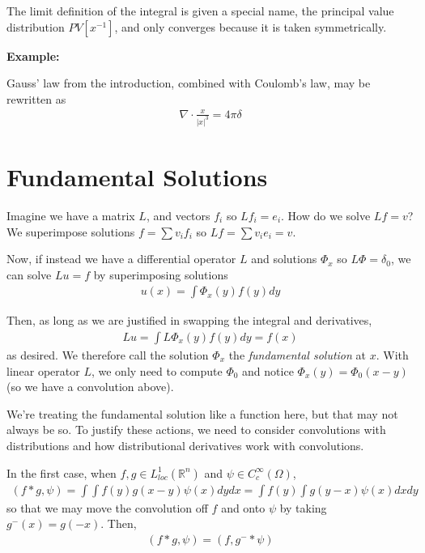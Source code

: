 \documentclass{article}
\newcommand{\R}{{\mathbb{R}}}
\begin{document}
	The limit definition of the integral is given a special name, the principal value distribution $PV[x^{-1}]$, and only converges because it is taken symmetrically. 
	
	
	\vspace{0.25 cm}
	\textbf{Example:}
	
	Gauss' law from the introduction, combined with Coulomb's law, may be rewritten as 
	\begin{align*}
		\nabla \cdot  \frac{x}{|x|^{3}} = 4 \pi \delta 
	\end{align*}
	
	
	\section{Fundamental Solutions}
	
	Imagine we have a matrix $L$, and vectors $f_i$ so $L f_i = e_i$. How do we solve $Lf = v$? We superimpose solutions $f = \sum v_{i}f_{i}$ so $Lf = \sum v_{i}e_{i} = v$. 
	
	Now, if instead we have a differential operator $L$ and solutions $\Phi_{x}$ so $L \Phi = \delta_0$, we can solve $Lu = f$ by superimposing solutions 
	\begin{align*}
		u(x) = \int \Phi_x(y) f(y)dy
	\end{align*}
	
	Then, as long as we are justified in swapping the integral and derivatives, 
	\begin{align*}
		Lu = \int L\Phi_x(y) f(y) dy = f(x)
	\end{align*}
	as desired. We therefore call the solution $\Phi_{x}$ the \textit{fundamental solution} at $x$. With linear operator $L$, we only need to compute $\Phi_0$ and notice $\Phi_{x}(y) = \Phi_{0}(x-y)$ (so we have a convolution above). 
	
	We're treating the fundamental solution like a function here, but that may not always be so. To justify these actions, we need to consider convolutions with distributions and how distributional derivatives work with convolutions. 
	
	In the first case, when $f,g \in L^{1}_{loc}(\R^{n})$ and $\psi \in C_{c}^{\infty}(\Omega)$, 
	\begin{align*}
		(f*g,\psi) = \int \int f(y)g(x-y)\psi(x)dydx = \int f(y) \int g(y-x)\psi(x)dxdy
	\end{align*}
	so that we may move the convolution off $f$ and onto $\psi$ by taking $g^-(x) = g(-x)$. Then, 
	\begin{align*}
		(f*g,\psi) = (f,g^- * \psi)
	\end{align*}
	
\end{document}
